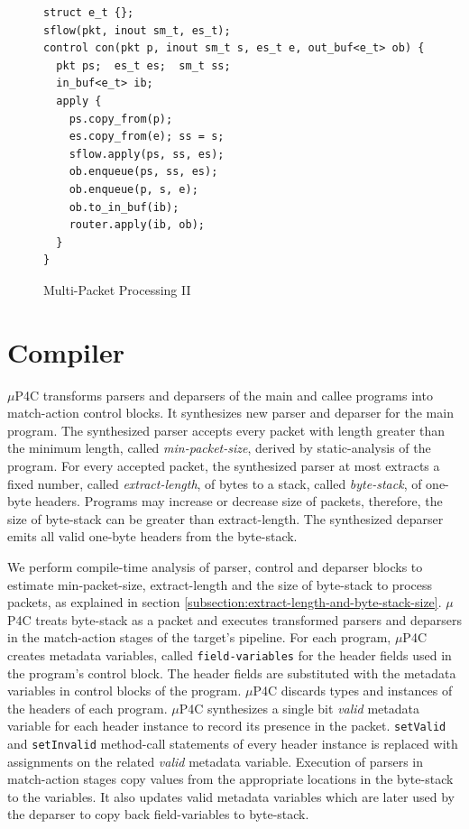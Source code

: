 \begin{figure}[!h]
\begin{lstlisting}[frame=none]
struct e_t {};
sflow(pkt, inout sm_t, es_t);
control con(pkt p, inout sm_t s, es_t e, out_buf<e_t> ob) {
  pkt ps;  es_t es;  sm_t ss;
  in_buf<e_t> ib;
  apply {
    ps.copy_from(p);
    es.copy_from(e); ss = s;
    sflow.apply(ps, ss, es); 
    ob.enqueue(ps, ss, es);
    ob.enqueue(p, s, e);
    ob.to_in_buf(ib);
    router.apply(ib, ob);
  }
}
\end{lstlisting}
\caption{Multi-Packet Processing II}
\label{fig:multi-packet-processing-II}
\end{figure}


\section{Compiler}
$\mu$P4C transforms parsers and deparsers of the main and callee programs into match-action control blocks.
It synthesizes new parser and deparser for the main program.
The synthesized parser accepts every packet with length greater than the minimum length, called \emph{min-packet-size}, derived by static-analysis of the program.
For every accepted packet, the synthesized parser at most extracts a fixed number, called \emph{extract-length}, of bytes to a stack, called \emph{byte-stack}, of one-byte headers.
Programs may increase or decrease size of packets, therefore, the size of byte-stack can be greater than extract-length.
The synthesized deparser emits all valid one-byte headers from the byte-stack.




We perform compile-time analysis of parser, control and deparser blocks to estimate min-packet-size, extract-length and the size of byte-stack to process packets, as explained in section \ref{subsection:extract-length-and-byte-stack-size}. 
$\mu$P4C treats byte-stack as a packet and executes transformed parsers and deparsers in the match-action stages of the target's pipeline.
For each program, $\mu$P4C creates metadata variables, called \texttt{field-variables} for the header fields used in the program's control block.
The header fields are substituted with the metadata variables in control blocks of the program.
$\mu$P4C discards types and instances of the headers of each program.
$\mu$P4C synthesizes a single bit \emph{valid} metadata variable for each header instance to record its presence in the packet.
\texttt{setValid} and \texttt{setInvalid} method-call statements of every header instance is replaced with assignments on the related \emph{valid} metadata variable.
Execution of parsers in match-action stages copy values from the appropriate locations in the byte-stack to the variables.
It also updates valid metadata variables which are later used by the deparser to copy back field-variables to byte-stack.


